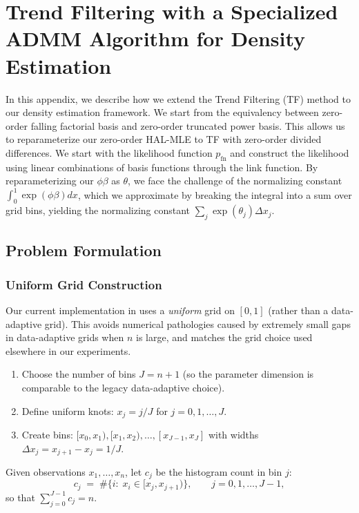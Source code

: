 \section{Trend Filtering with a Specialized ADMM Algorithm for Density Estimation}
\label{app:tf_admm}

In this appendix, we describe how we extend the Trend Filtering (TF) method to our density estimation framework. We start from the equivalency between zero-order falling factorial basis and zero-order truncated power basis. This allows us to reparameterize our zero-order HAL-MLE to TF with zero-order divided differences. We start with the likelihood function $p_{\text{fn}}$ and construct the likelihood using linear combinations of basis functions through the link function. By reparameterizing our $\phi \beta$ as $\theta$, we face the challenge of the normalizing constant $\int_0^1 \exp(\phi \beta) dx$, which we approximate by breaking the integral into a sum over grid bins, yielding the normalizing constant $\sum_j \exp(\theta_j) \Delta x_j$.

\subsection{Problem Formulation}

\subsubsection{Uniform Grid Construction}

Our current implementation in  uses a \emph{uniform} grid on $[0,1]$ (rather than a data-adaptive grid). This avoids numerical pathologies caused by extremely small gaps in data-adaptive grids when $n$ is large, and matches the grid choice used elsewhere in our experiments.

\begin{enumerate}
\item Choose the number of bins $J = n+1$ (so the parameter dimension is comparable to the legacy data-adaptive choice).
\item Define uniform knots: $x_j = j/J$ for $j = 0,1,\ldots,J$.
\item Create bins: $[x_0, x_1), [x_1, x_2), \ldots, [x_{J-1}, x_J]$ with widths $\Delta x_j = x_{j+1}-x_j = 1/J$.
\end{enumerate}

Given observations $x_1,\ldots,x_n$, let $c_j$ be the histogram count in bin $j$:
\[
c_j \;=\; \#\{i:\; x_i \in [x_j,x_{j+1})\}, \qquad j=0,1,\ldots,J-1,
\]
so that $\sum_{j=0}^{J-1} c_j = n$.

